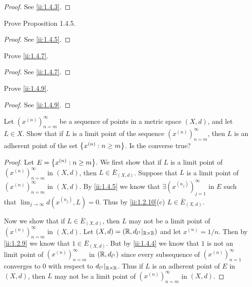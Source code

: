 \begin{proof}
  See \cref{ii:1.4.3}.
\end{proof}

\begin{ex}\label{ii:ex:1.4.2}
  Prove Proposition 1.4.5.
\end{ex}

\begin{proof}
  See \cref{ii:1.4.5}.
\end{proof}

\begin{ex}\label{ii:ex:1.4.3}
  Prove \cref{ii:1.4.7}.
\end{ex}

\begin{proof}
  See \cref{ii:1.4.7}.
\end{proof}

\begin{ex}\label{ii:ex:1.4.4}
  Prove \cref{ii:1.4.9}.
\end{ex}

\begin{proof}
  See \cref{ii:1.4.9}.
\end{proof}

\begin{ex}\label{ii:ex:1.4.5}
  Let \((x^{(n)})_{n = m}^\infty\) be a sequence of points in a metric space \((X, d)\), and let \(L \in X\).
  Show that if \(L\) is a limit point of the sequence \((x^{(n)})_{n = m}^\infty\), then \(L\) is an adherent point of the set \(\left\lbrace x^{(n)} : n \geq m\right\rbrace\).
  Is the converse true?
\end{ex}

\begin{proof}
  Let \(E = \left\lbrace x^{(n)} : n \geq m\right\rbrace\).
  We first show that if \(L\) is a limit point of \((x^{(n)})_{n = m}^\infty\) in \((X, d)\), then \(L \in \overline{E}_{(X, d)}\).
  Suppose that \(L\) is a limit point of \((x^{(n)})_{n = m}^\infty\) in \((X, d)\).
  By \cref{ii:1.4.5} we know that \(\exists (x^{(n_j)})_{j = 1}^\infty\) in \(E\) such that \(\lim_{j \to \infty} d(x^{(n_j)}, L) = 0\).
  Thus by \cref{ii:1.2.10}(c) \(L \in \overline{E}_{(X, d)}\).

  Now we show that if \(L \in \overline{E}_{(X, d)}\), then \(L\) may not be a limit point of \((x^{(n)})_{n = m}^\infty\) in \((X, d)\).
  Let \((X, d) = (\mathbb{R}, d_{l^1}|_{\mathbb{R} \times \mathbb{R}})\) and let \(x^{(n)} = 1 / n\).
  Then by \cref{ii:1.2.9} we know that \(1 \in \overline{E}_{(X, d)}\).
  But by \cref{ii:1.4.4} we know that \(1\) is not an limit point of \((x^{(n)})_{n = m}^\infty\) in \((\mathbb{R}, d_{l^1})\) since every subsequence of \((x^{(n)})_{n = 1}^\infty\) converges to \(0\) with respect to \(d_{l^1}|_{\mathbb{R} \times \mathbb{R}}\).
  Thus if \(L\) is an adherent point of \(E\) in \((X, d)\), then \(L\) may not be a limit point of \((x^{(n)})_{n = m}^\infty\) in \((X, d)\).
\end{proof}

